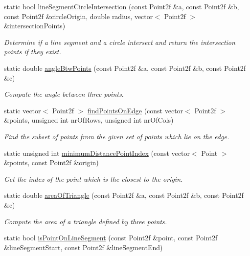 \begin{DoxyCompactItemize}
static bool \hyperlink{classmultiscale_1_1Geometry2D_a92bd36cdda4cdacb4101c6db54474a6d}{line\-Segment\-Circle\-Intersection} (const \-Point2f \&a, const \-Point2f \&b, const \-Point2f \&circle\-Origin, double radius, vector$<$ \-Point2f $>$ \&intersection\-Points)
\begin{DoxyCompactList}\small\item\em \-Determine if a line segment and a circle intersect and return the intersection points if they exist. \end{DoxyCompactList}\item 
static double \hyperlink{classmultiscale_1_1Geometry2D_ace72cd1329667fdb5bc3fc40b96694bd}{angle\-Btw\-Points} (const \-Point2f \&a, const \-Point2f \&b, const \-Point2f \&c)
\begin{DoxyCompactList}\small\item\em \-Compute the angle between three points. \end{DoxyCompactList}\item 
static vector$<$ \-Point2f $>$ \hyperlink{classmultiscale_1_1Geometry2D_a9e5c6378463c0e685136d66bfac2a8c1}{find\-Points\-On\-Edge} (const vector$<$ \-Point2f $>$ \&points, unsigned int nr\-Of\-Rows, unsigned int nr\-Of\-Cols)
\begin{DoxyCompactList}\small\item\em \-Find the subset of points from the given set of points which lie on the edge. \end{DoxyCompactList}\item 
static unsigned int \hyperlink{classmultiscale_1_1Geometry2D_ae8e5e46c312835e27478ce00b11f8a7c}{minimum\-Distance\-Point\-Index} (const vector$<$ \-Point $>$ \&points, const \-Point2f \&origin)
\begin{DoxyCompactList}\small\item\em \-Get the index of the point which is the closest to the origin. \end{DoxyCompactList}\item 
static double \hyperlink{classmultiscale_1_1Geometry2D_abf0e96a63cf744cab74ab94398e28562}{area\-Of\-Triangle} (const \-Point2f \&a, const \-Point2f \&b, const \-Point2f \&c)
\begin{DoxyCompactList}\small\item\em \-Compute the area of a triangle defined by three points. \end{DoxyCompactList}\item 
static bool \hyperlink{classmultiscale_1_1Geometry2D_a608548e8588d9efbcfec90d2bd92ea55}{is\-Point\-On\-Line\-Segment} (const \-Point2f \&point, const \-Point2f \&line\-Segment\-Start, const \-Point2f \&line\-Segment\-End)

\end{DoxyCompactItemize}
